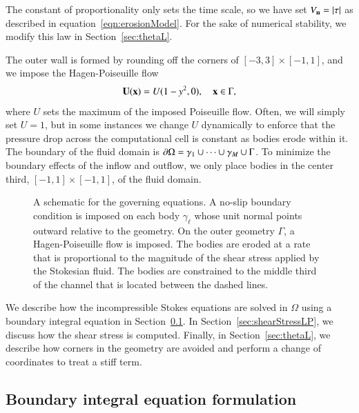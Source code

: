 \documentclass[preprint, 10pt]{elsarticle}
\begin{document}
The constant of proportionality only sets the time scale, so we have set
$V_{\mathbf{n}} = |\tau|$ as described in equation~\eqref{eqn:erosionModel}.  For
the sake of numerical stability, we modify this law in
Section~\ref{sec:thetaL}. 

The outer wall is formed by rounding off the corners
of $[-3,3] \times [-1,1]$, and we impose the Hagen-Poiseuille flow
\begin{align*}
  {\mathbf{U}}({\mathbf{x}}) = U (1-y^2,0), \quad {\mathbf{x}} \in \Gamma,
\end{align*}
where $U$ sets the maximum of the imposed Poiseuille flow. Often, we
will simply set $U=1$, but in some instances we change $U$ dynamically
to enforce that the pressure drop across the computational cell is
constant as bodies erode within it.  The boundary of the fluid domain is
${\partial}\Omega = \gamma_1 \cup \cdots \cup \gamma_M \cup \Gamma$.  To
minimize the boundary effects of the inflow and outflow, we only place
bodies in the center third, $[-1,1] \times [-1,1]$, of the fluid domain.

\begin{figure}[htpb]
  \centering
  
  \caption{\label{fig:schematic} A schematic for the governing
    equations.  A no-slip boundary condition is imposed on each body
    $\gamma_\ell$ whose unit normal points outward relative to the
    geometry.  On the outer geometry $\Gamma$, a Hagen-Poiseuille flow
    is imposed.  The bodies are eroded at a rate that is proportional to
    the magnitude of the shear stress applied by the Stokesian fluid.
    The bodies are constrained to the middle third of the channel that
    is located between the dashed lines.}
\end{figure}

We describe how the incompressible Stokes equations are solved in
$\Omega$ using a boundary integral equation in Section~\ref{sec:bies}.
In Section~\ref{sec:shearStressLP}, we discuss how the shear stress is
computed.  Finally, in Section~\ref{sec:thetaL}, we describe how corners
in the geometry are avoided and perform a change of coordinates to treat
a stiff term.


\subsection{Boundary integral equation formulation} 
\label{sec:bies}
\end{document}
